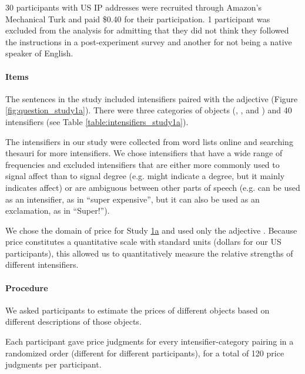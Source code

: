 30 participants with US IP addresses were recruited through Amazon’s Mechanical Turk and paid \$0.40 for their participation. 1 participant was excluded from the analysis for admitting that they did not think they followed the instructions in a post-experiment survey and another for not being a native speaker of English.

\paragraph{Items}

The sentences in the study included intensifiers paired with the adjective  (Figure \ref{fig:question_study1a}).
There were three categories of objects (, , and ) and 40 intensifiers (see Table \ref{table:intensifiers_study1a}).

The intensifiers in our study were collected from word lists online and searching thesauri for more intensifiers.
We chose intensifiers that have a wide range of frequencies and excluded intensifiers that are either more commonly used to signal affect than to signal degree (e.g.  might indicate a degree, but it mainly indicates affect) or are ambiguous between other parts of speech (e.g.  can be used as an intensifier, as in ``super expensive'', but it can also be used as an exclamation, as in ``Super!'').

We chose the domain of price for Study \hyperref[sec:study1a]{1a} and used only the adjective .
Because price constitutes a quantitative scale with standard units (dollars for our US participants), this allowed us to quantitatively measure the relative strengths of different intensifiers.

\paragraph{Procedure%
}

We asked participants to estimate the prices of different objects based on different descriptions of those objects. 

Each participant gave price judgments for every intensifier-category pairing in a randomized order (different for different participants), for a total of 120 price judgments per participant.  

